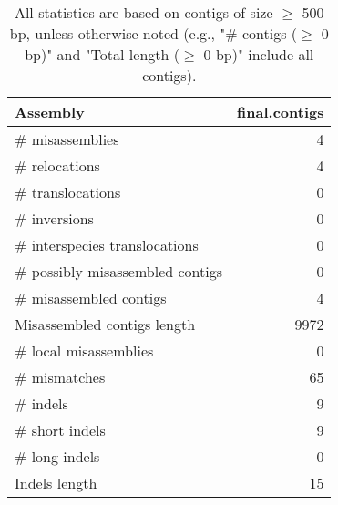 \documentclass[12pt,a4paper]{article}
\begin{document}
\begin{table}[ht]
\begin{center}
\caption{All statistics are based on contigs of size $\geq$ 500 bp, unless otherwise noted (e.g., "\# contigs ($\geq$ 0 bp)" and "Total length ($\geq$ 0 bp)" include all contigs).}
\begin{tabular}{|l*{1}{|r}|}
\hline
Assembly & final.contigs \\ \hline
\# misassemblies & 4 \\ \hline
\hspace{5mm}\# relocations & 4 \\ \hline
\hspace{5mm}\# translocations & 0 \\ \hline
\hspace{5mm}\# inversions & 0 \\ \hline
\hspace{5mm}\# interspecies translocations & 0 \\ \hline
\# possibly misassembled contigs & 0 \\ \hline
\# misassembled contigs & 4 \\ \hline
Misassembled contigs length & 9972 \\ \hline
\# local misassemblies & 0 \\ \hline
\# mismatches & 65 \\ \hline
\# indels & 9 \\ \hline
\hspace{5mm}\# short indels & 9 \\ \hline
\hspace{5mm}\# long indels & 0 \\ \hline
Indels length & 15 \\ \hline
\end{tabular}
\end{center}
\end{table}
\end{document}
